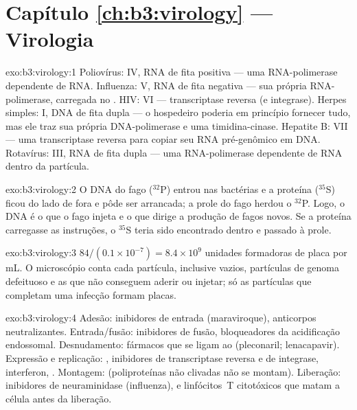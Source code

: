 \section*{Capítulo \ref{ch:b3:virology} --- Virologia}

\begin{solution}{exo:b3:virology:1}
Poliovírus: IV, RNA de fita positiva --- uma RNA-polimerase dependente
de RNA. Influenza: V, RNA de fita negativa --- sua própria
RNA-polimerase, carregada no . HIV: VI --- transcriptase reversa
(e integrase). Herpes simples: I, DNA de fita dupla --- o hospedeiro
poderia em princípio fornecer tudo, mas ele traz sua própria
DNA-polimerase e uma timidina-cinase. Hepatite B: VII --- uma
transcriptase reversa para copiar seu RNA pré-genômico em DNA.
Rotavírus: III, RNA de fita dupla --- uma RNA-polimerase dependente de
RNA dentro da partícula.
\end{solution}

\begin{solution}{exo:b3:virology:2}
O DNA do fago ($^{32}$P) entrou nas bactérias e a proteína ($^{35}$S)
ficou do lado de fora e pôde ser arrancada; a prole do fago herdou o
$^{32}$P. Logo, o DNA é o que o fago injeta e o que dirige a produção
de fagos novos. Se a proteína carregasse as instruções, o $^{35}$S
teria sido encontrado dentro e passado à prole.
\end{solution}

\begin{solution}{exo:b3:virology:3}
$84/(0.1\times 10^{-7}) = 8.4\times 10^{9}$ unidades formadoras de
placa por mL. O microscópio conta cada partícula, inclusive 
vazios, partículas de genoma defeituoso e as que não conseguem aderir
ou injetar; só as partículas que completam uma infecção formam placas.
\end{solution}

\begin{solution}{exo:b3:virology:4}
Adesão: inibidores de entrada (maraviroque), anticorpos
neutralizantes. Entrada/fusão: inibidores de fusão, bloqueadores da
acidificação endossomal. Desnudamento: fármacos que se ligam ao
 (pleconaril; lenacapavir). Expressão e replicação: , inibidores de transcriptase reversa e de integrase,
interferon, . Montagem: 
(poliproteínas não clivadas não se montam). Liberação: inibidores de
neuraminidase (influenza), e linfócitos~T citotóxicos que matam a
célula antes da liberação.
\end{solution}

